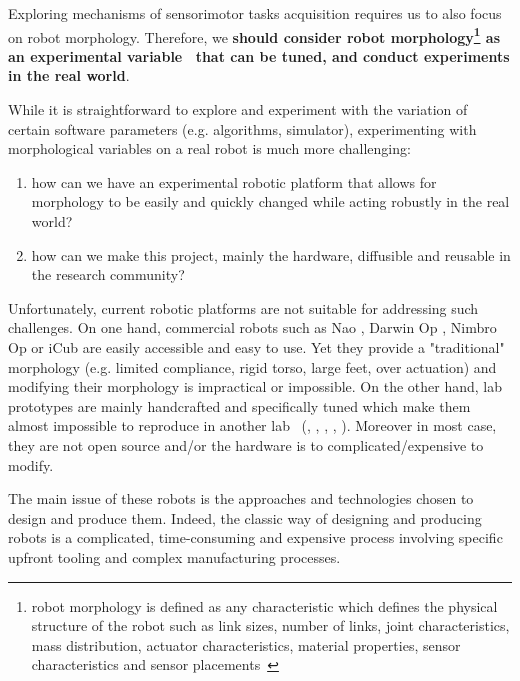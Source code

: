 
Exploring mechanisms of sensorimotor tasks acquisition requires us to also focus on robot morphology. Therefore, we \textbf{should consider robot morphology\footnote{ robot morphology is defined as any characteristic which defines the physical structure of the robot such as link sizes, number of links, joint characteristics, mass distribution, actuator characteristics, material properties, sensor characteristics and sensor placements~\parencite{paul2006morphological}} as an experimental variable~\parencite{kaplan2008corps} that can be tuned, and conduct experiments in the real world}.

While it is straightforward to explore and experiment with the variation of certain software parameters (e.g. algorithms, simulator), experimenting with morphological variables on a real robot is much more challenging:

\begin{enumerate}
    \item how can we have an experimental robotic platform that allows for morphology to be easily and quickly changed  while acting robustly in the real world?
    \item how can we make this project, mainly the hardware, diffusible and reusable in the research community?
\end{enumerate}

Unfortunately, current robotic platforms are not suitable for addressing such challenges. On one hand, commercial robots such as Nao \parencite{gouaillier2008nao}, Darwin Op \parencite{ha2011development}, Nimbro Op \parencite{schwarznimbro} or iCub \parencite{metta2008icub} are easily accessible and easy to use. Yet they provide a "traditional" morphology (e.g. limited compliance, rigid torso, large feet, over actuation) and modifying their morphology is impractical or impossible.
On the other hand, lab prototypes are mainly handcrafted and specifically tuned which make them almost impossible to reproduce in another lab ~(\cite{wisse2007passive}, \cite{nakanishi2013design}, \cite{ly2011bio}, \cite{niiyama2010athlete}, \cite{radkhah2011concept}). Moreover in most case, they are not open source and/or the hardware is to complicated/expensive to modify.

The main issue of these robots is the approaches and technologies chosen to design and produce them. Indeed, the classic way of designing and producing robots is a complicated, time-consuming and expensive process involving specific upfront tooling and complex manufacturing processes.


